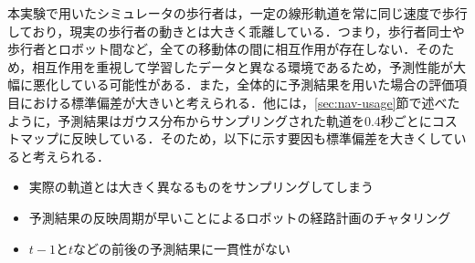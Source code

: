 本実験で用いたシミュレータの歩行者は，一定の線形軌道を常に同じ速度で歩行しており，現実の歩行者の動きとは大きく乖離している．つまり，歩行者同士や歩行者とロボット間など，全ての移動体の間に相互作用が存在しない．そのため，相互作用を重視して学習したデータと異なる環境であるため，予測性能が大幅に悪化している可能性がある．また，全体的に予測結果を用いた場合の評価項目における標準偏差が大きいと考えられる．他には，\ref{sec:nav-usage}節で述べたように，予測結果はガウス分布からサンプリングされた軌道を0.4秒ごとにコストマップに反映している．そのため，以下に示す要因も標準偏差を大きくしていると考えられる．
\begin{itemize}
  \item 実際の軌道とは大きく異なるものをサンプリングしてしまう
  \item 予測結果の反映周期が早いことによるロボットの経路計画のチャタリング
  \item $t-1\text{と}t$などの前後の予測結果に一貫性がない
\end{itemize}

\newpage

